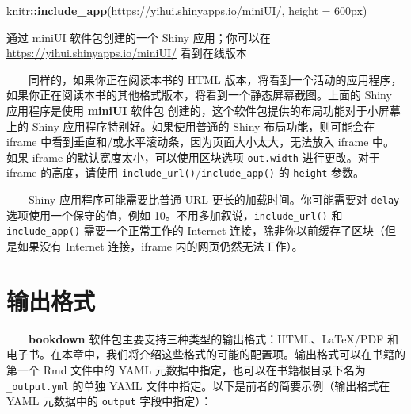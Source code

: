 \documentclass[
  12pt,
]{krantz}
\newenvironment{Shaded}{\begin{snugshade}}{\end{snugshade}}
\newcommand{\AttributeTok}[1]{\textcolor[rgb]{0.13,0.29,0.53}{#1}}
\newcommand{\FunctionTok}[1]{\textcolor[rgb]{0.13,0.29,0.53}{\textbf{#1}}}
\newcommand{\NormalTok}[1]{#1}
\newcommand{\SpecialCharTok}[1]{\textcolor[rgb]{0.81,0.36,0.00}{\textbf{#1}}}
\newcommand{\StringTok}[1]{\textcolor[rgb]{0.31,0.60,0.02}{#1}}
\renewcommand{\href}[2]{#2\footnote{\url{#1}}}
\theoremstyle{definition}
\theoremstyle{definition}
\theoremstyle{definition}
\theoremstyle{definition}
\theoremstyle{remark}
\begin{document}
\begin{Shaded}
\begin{Highlighting}[]
\NormalTok{knitr}\SpecialCharTok{::}\FunctionTok{include\_app}\NormalTok{(}\StringTok{\textquotesingle{}https://yihui.shinyapps.io/miniUI/\textquotesingle{}}\NormalTok{, }\AttributeTok{height =} \StringTok{\textquotesingle{}600px\textquotesingle{}}\NormalTok{)}
\end{Highlighting}
\end{Shaded}

\label{fig:miniUI}通过 miniUI 软件包创建的一个 Shiny 应用；你可以在 \url{https://yihui.shinyapps.io/miniUI/} 看到在线版本

\let\href\ooldhref

  同样的，如果你正在阅读本书的 HTML 版本，将看到一个活动的应用程序，如果你正在阅读本书的其他格式版本，将看到一个静态屏幕截图。上面的 Shiny 应用程序是使用 \textbf{miniUI} 软件包 \citep{R-miniUI} 创建的，这个软件包提供的布局功能对于小屏幕上的 Shiny 应用程序特别好。如果使用普通的 Shiny 布局功能，则可能会在 iframe 中看到垂直和/或水平滚动条，因为页面大小太大，无法放入 iframe 中。如果 iframe 的默认宽度太小，可以使用区块选项 \texttt{out.width} 进行更改。对于 iframe 的高度，请使用 \texttt{include\_url()}/\texttt{include\_app()} 的 \texttt{height} 参数。

  Shiny 应用程序可能需要比普通 URL 更长的加载时间。你可能需要对 \texttt{delay} 选项使用一个保守的值，例如 10。不用多加叙说，\texttt{include\_url()} 和 \texttt{include\_app()} 需要一个正常工作的 Internet 连接，除非你以前缓存了区块（但是如果没有 Internet 连接，iframe 内的网页仍然无法工作）。

\hypertarget{output-formats}{%
\chapter{输出格式}\label{output-formats}}

  \textbf{bookdown} 软件包主要支持三种类型的输出格式：HTML、LaTeX/PDF 和电子书。在本章中，我们将介绍这些格式的可能的配置项。输出格式可以在书籍的第一个 Rmd 文件中的 YAML 元数据中指定，也可以在书籍根目录下名为 \texttt{\_output.yml} 的单独 YAML 文件中指定。以下是前者的简要示例（输出格式在 YAML 元数据中的 \texttt{output} 字段中指定）：
\end{document}
